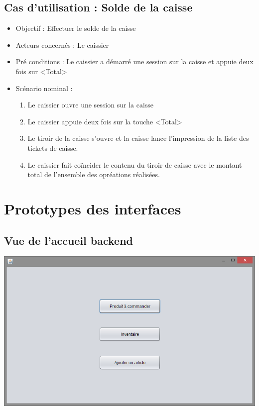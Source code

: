 \subsection{Cas d'utilisation : Solde de la caisse}
\begin{itemize}
	\item Objectif : Effectuer le solde de la caisse
	\item Acteurs concernés : Le caissier
	\item Pré conditions : Le caissier a démarré une session sur la caisse et appuie deux fois sur <Total>
	\item Scénario nominal :
	\begin{enumerate}
		\item Le caissier ouvre une session sur la caisse
		\item Le caissier appuie deux fois sur la touche <Total>
		\item Le tiroir de la caisse s'ouvre et la caisse lance l'impression de la liste des tickets de caisse.
		\item Le caissier fait coïncider le contenu du tiroir de caisse avec le montant total de l'ensemble des opréations réalisées.
	\end{enumerate}
\end{itemize}




\section{Prototypes des interfaces}

\subsection{Vue de l'accueil backend}
\begin{center}
	\includegraphics[width=14cm]{HomeView.png}
\end{center}

